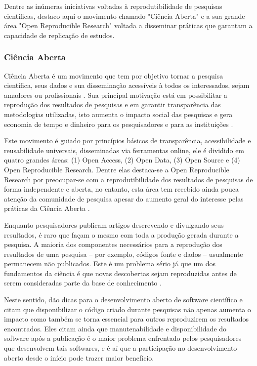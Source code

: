 \documentclass[12pt]{article}
\begin{document}
Dentre as inúmeras iniciativas voltadas à reprodutibilidade
de pesquisas científicas, destaco aqui o movimento chamado "Ciência Aberta" e
a sua grande área "Open Reproducible Research" voltada a disseminar práticas
que garantam a capacidade de replicação de estudos.

\subsubsection{Ciência Aberta}

Ciência Aberta é um movimento que tem por objetivo tornar a pesquisa
científica, seus dados e sua disseminação acessíveis à todos os interessados,
sejam amadores ou profissionais \cite{WikipediaOpenScience}. Sua principal
motivação está em possibilitar a reprodução dos resultados de pesquisas e em
garantir transparência das metodologias utilizadas, isto aumenta o impacto
social das pesquisas e gera economia de tempo e dinheiro para os pesquisadores
e para as instituições \cite{Nesta2010}.

Este movimento é guiado por princípios básicos de transparência,
acessibilidade e reusabilidade universais, disseminadas via ferramentas
online, ele é dividido em quatro grandes áreas: (1) Open Access, (2) Open
Data, (3) Open Source e (4) Open Reproducible Research. Dentre elas destaca-se
a Open Reproducible Research por preocupar-se com a reprodutibilidade dos
resultados de pesquisas de forma independente \cite{Stodden2009} e aberta, no
entanto, esta área tem recebido ainda pouca atenção da comunidade de pesquisa
\cite{Nancy2015} \cite{Grand2010Open} apesar do aumento geral do interesse
pelas práticas da Ciência Aberta \cite{Grand2010}.

Enquanto pesquisadores publicam artigos descrevendo e divulgando seus
resultados, é raro que façam o mesmo com toda a produção gerada durante a
pesquisa. A maioria dos componentes necessários para a reprodução dos
resultados de uma pesquisa -- por exemplo, códigos fonte e dados -- usualmente
permanecem não publicados. Este é um problema sério já que um dos fundamentos
da ciência é que novas descobertas sejam reproduzidas antes de serem
consideradas parte da base de conhecimento \cite{Stodden2009}.

Neste sentido,  dão dicas para o desenvolvimento aberto de software
científico e citam que disponibilizar o código criado durante pesquisas não
apenas aumenta o impacto como também se torna essencial para outros
reproduzirem os resultados encontrados. Eles citam ainda que manutenabilidade
e disponibilidade do software após a publicação é o maior problema enfrentado
pelos pesquisadores que desenvolvem tais softwares, e é aí que a
participação no desenvolvimento aberto desde o início pode trazer maior
benefício.
\end{document}
